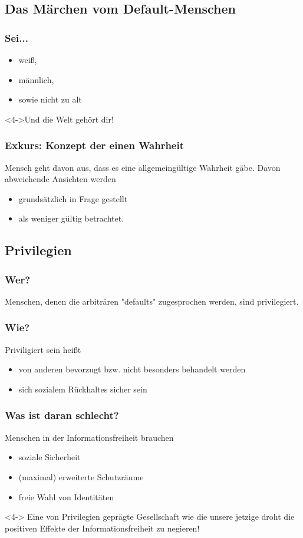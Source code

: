 \documentclass{beamer}
\begin{document}
\subsection{Das Märchen vom Default-Menschen}
\frame
{
  \frametitle{Sei...}
  
  \begin{itemize}[<+->]
  \item weiß,
  \item männlich,
  \item sowie nicht zu alt
  \end{itemize}
  
  \begin{block}<4->{Und die Welt gehört dir!}
  \end{block}
}
\frame
{
  \frametitle{Exkurs: Konzept der einen Wahrheit}
  
  Mensch geht davon aus, dass es eine allgemeingültige Wahrheit gäbe.
  Davon abweichende Ansichten werden
  \begin{itemize}
    \item grundsätzlich in Frage gestellt
    \item als weniger gültig betrachtet.
  \end{itemize}
}
\subsection{Privilegien}
\frame
{
  \frametitle{Wer?}
  
  Menschen, denen die arbiträren "defaults" zugesprochen werden, sind privilegiert.
}
\frame
{
  \frametitle{Wie?}
  
  Priviligiert sein heißt
  \begin{itemize}[<+->]
  \item von anderen bevorzugt bzw. nicht besonders behandelt werden
  \item sich sozialem Rückhaltes sicher sein
  \end{itemize}
}
\frame
{ 
  \frametitle{Was ist daran schlecht?}
  
  Menschen in der Informationsfreiheit brauchen
  \begin{itemize}[<+->]
  \item soziale Sicherheit
  \item (maximal) erweiterte Schutzräume 
  \item freie Wahl von Identitäten
  \end{itemize}
  
  \begin{theorem}<4->
    Eine von Privilegien geprägte Gesellschaft wie die unsere jetzige droht die positiven Effekte der Informationsfreiheit zu negieren! 
  \end{theorem}
}
\end{document}
